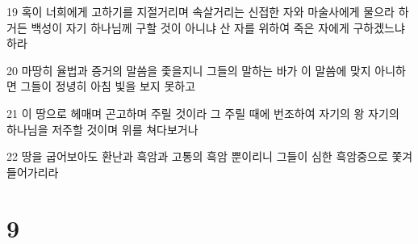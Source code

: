 \par 19 혹이 너희에게 고하기를 지절거리며 속살거리는 신접한 자와 마술사에게 물으라 하거든 백성이 자기 하나님께 구할 것이 아니냐 산 자를 위하여 죽은 자에게 구하겠느냐 하라
\par 20 마땅히 율법과 증거의 말씀을 좇을지니 그들의 말하는 바가 이 말씀에 맞지 아니하면 그들이 정녕히 아침 빛을 보지 못하고
\par 21 이 땅으로 헤매며 곤고하며 주릴 것이라 그 주릴 때에 번조하여 자기의 왕 자기의 하나님을 저주할 것이며 위를 쳐다보거나
\par 22 땅을 굽어보아도 환난과 흑암과 고통의 흑암 뿐이리니 그들이 심한 흑암중으로 쫓겨 들어가리라

\chapter{9}

